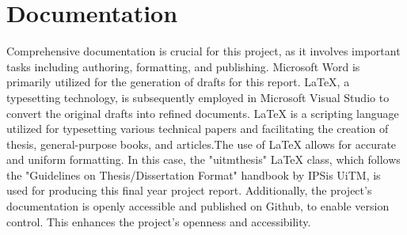 \section{Documentation}
Comprehensive documentation is crucial for this project, as it involves important tasks including authoring, formatting, and publishing. Microsoft Word is primarily utilized for the generation of drafts for this report. LaTeX, a typesetting technology, is subsequently employed in Microsoft Visual Studio to convert the original drafts into refined documents. LaTeX is a scripting language utilized for typesetting various technical papers and facilitating the creation of thesis, general-purpose books, and articles.The use of LaTeX allows for accurate and uniform formatting. In this case, the "uitmthesis" LaTeX class, which follows the "Guidelines on Thesis/Dissertation Format" handbook by IPSis UiTM, is used for producing this final year project report. Additionally, the project's documentation is openly accessible and published on Github, to enable version control. This enhances the project's openness and accessibility.
\pagebreak